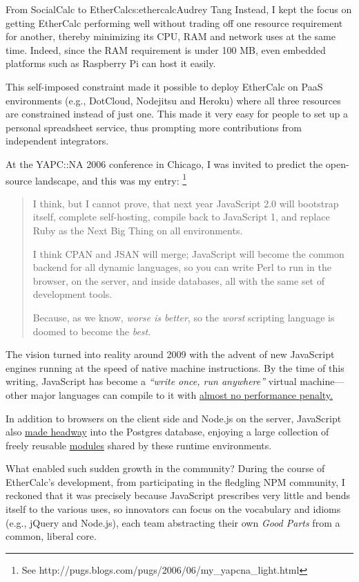 \begin{aosachapter}{From SocialCalc to EtherCalc}{s:ethercalc}{Audrey Tang}
Instead, I kept the focus on getting EtherCalc performing well without
trading off one resource requirement for another, thereby minimizing its
CPU, RAM and network uses at the same time. Indeed, since the RAM
requirement is under 100 MB, even embedded platforms such as Raspberry
Pi can host it easily.

This self-imposed constraint made it possible to deploy EtherCalc on
PaaS environments (e.g., DotCloud, Nodejitsu and Heroku) where all three
resources are constrained instead of just one. This made it very easy
for people to set up a personal spreadsheet service, thus prompting more
contributions from independent integrators.


At the YAPC::NA 2006 conference in Chicago, I was invited to predict the
open-source landscape, and this was my entry:
\footnote{See http://pugs.blogs.com/pugs/2006/06/my\_yapcna\_light.html}

\begin{quote}
I think, but I cannot prove, that next year JavaScript 2.0 will
bootstrap itself, complete self-hosting, compile back to JavaScript 1,
and replace Ruby as the Next Big Thing on all environments.

I think CPAN and JSAN will merge; JavaScript will become the common
backend for all dynamic languages, so you can write Perl to run in the
browser, on the server, and inside databases, all with the same set of
development tools.

Because, as we know, \emph{worse is better}, so the \emph{worst}
scripting language is doomed to become the \emph{best}.
\end{quote}

The vision turned into reality around 2009 with the advent of new
JavaScript engines running at the speed of native machine instructions.
By the time of this writing, JavaScript has become a \emph{``write once,
run anywhere''} virtual machine---other major languages can compile to
it with \href{http://asmjs.org}{almost no performance penalty.}

In addition to browsers on the client side and Node.js on the server,
JavaScript also \href{http://pgre.st/}{made headway} into the Postgres
database, enjoying a large collection of freely reusable
\href{https://npmjs.org/}{modules} shared by these runtime environments.

What enabled such sudden growth in the community? During the course of
EtherCalc's development, from participating in the fledgling NPM
community, I reckoned that it was precisely because JavaScript
prescribes very little and bends itself to the various uses, so
innovators can focus on the vocabulary and idioms (e.g., jQuery and
Node.js), each team abstracting their own \emph{Good Parts} from a
common, liberal core.


\end{aosachapter}
